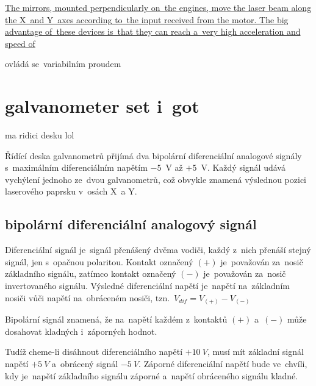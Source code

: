 \href{https://elenlaser.com/blog/galvo-head-laser-focus-tool.html}{The mirrors, mounted perpendicularly on~the engines, move the laser beam along the X~and Y~axes according to~the input received from the motor.
The big advantage of~these devices is~that they can reach a~very high acceleration and speed of}

ovládá se~variabilním proudem

\section{galvanometer set i~got} \label{sec:my-galvos}

ma ridici desku lol

Řídící deska galvanometrů přijímá dva bipolární diferenciální analogové signály s~maximálním diferenciálním napětím $-5$~V až $+5$~V. Každý signál udává vychýlení jednoho ze~dvou galvanometrů, což obvykle znamená výslednou pozici laserového paprsku v~osách X~a Y.

\subsection{bipolární diferenciální analogový signál~\cite{ilda-signal-spec}}
Diferenciální signál je~signál přenášený dvěma vodiči, každý z~nich přenáší stejný signál, jen s~opačnou polaritou. Kontakt označený $(+)$ je~považován za~nosič základního signálu, zatímco kontakt označený $(-)$ je~považován za~nosič invertovaného signálu. Výsledné diferenciální napětí je~napětí na~základním nosiči vůči napětí na~obráceném nosiči, tzn.~$V_{dif} = V_{(+)} - V_{(-)}$

Bipolární signál znamená, že na~napětí každém z~kontaktů $(+)$ a~$(-)$ může dosahovat kladných i~záporných hodnot.

Tudíž cheme-li disáhnout diferenciálního napětí $+10~V$, musí mít základní signál napětí $+5~V$ a~obrácený signál $-5~V$. Záporné diferenciální napětí bude ve~chvíli, kdy je~napětí základního signálu záporné a~napětí obráceného signálu kladné.

